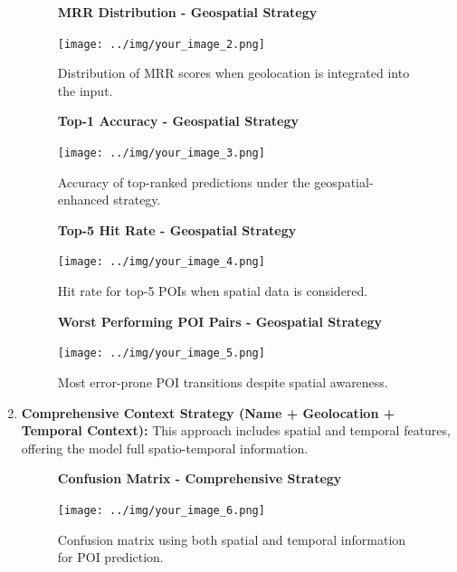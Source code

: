 \documentclass[12pt,a4paper]{article}
\begin{document}
\begin{enumerate}
\begin{figure}[H]
\centering
\textbf{MRR Distribution - Geospatial Strategy}\par
\vspace{0.5em}
\texttt{[image: ../img/your\_image\_2.png]}
\caption{Distribution of MRR scores when geolocation is integrated into the input.}
\label{fig:geospatial_mrr}
\end{figure}

\begin{figure}[H]
\centering
\textbf{Top-1 Accuracy - Geospatial Strategy}\par
\vspace{0.5em}
\texttt{[image: ../img/your\_image\_3.png]}
\caption{Accuracy of top-ranked predictions under the geospatial-enhanced strategy.}
\label{fig:geospatial_top1}
\end{figure}

\begin{figure}[H]
\centering
\textbf{Top-5 Hit Rate - Geospatial Strategy}\par
\vspace{0.5em}
\texttt{[image: ../img/your\_image\_4.png]}
\caption{Hit rate for top-5 POIs when spatial data is considered.}
\label{fig:geospatial_top5}
\end{figure}

\begin{figure}[H]
\centering
\textbf{Worst Performing POI Pairs - Geospatial Strategy}\par
\vspace{0.5em}
\texttt{[image: ../img/your\_image\_5.png]}
\caption{Most error-prone POI transitions despite spatial awareness.}
\label{fig:geospatial_worst_pairs}
\end{figure}

\item \textbf{Comprehensive Context Strategy (Name + Geolocation + Temporal Context):} This approach includes spatial and temporal features, offering the model full spatio-temporal information.

\begin{figure}[H]
\centering
\textbf{Confusion Matrix - Comprehensive Strategy}\par
\vspace{0.5em}
\texttt{[image: ../img/your\_image\_6.png]}
\caption{Confusion matrix using both spatial and temporal information for POI prediction.}
\label{fig:comprehensive_confusion}
\end{figure}


\end{enumerate}
\end{document}
